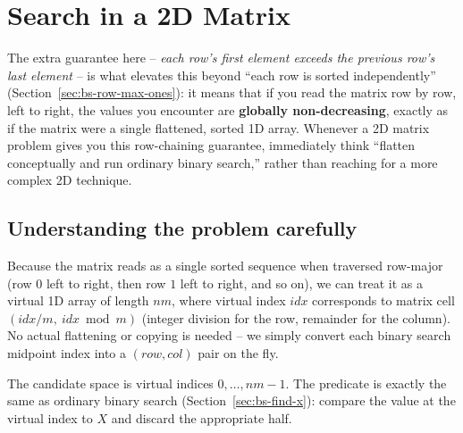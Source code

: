 \section{Search in a 2D Matrix}
\label{sec:bs-search-2d-matrix}


\begin{patternbox}
The extra guarantee here -- \emph{each row's first element exceeds the
previous row's last element} -- is what elevates this beyond ``each row is
sorted independently'' (Section~\ref{sec:bs-row-max-ones}): it means that
if you read the matrix row by row, left to right, the values you encounter
are \textbf{globally non-decreasing}, exactly as if the matrix were a
single flattened, sorted 1D array. Whenever a 2D matrix problem gives you
this row-chaining guarantee, immediately think ``flatten conceptually and
run ordinary binary search,'' rather than reaching for a more complex 2D
technique.
\end{patternbox}

\subsection*{Understanding the problem carefully}

Because the matrix reads as a single sorted sequence when traversed
row-major (row $0$ left to right, then row $1$ left to right, and so on),
we can treat it as a virtual 1D array of length $nm$, where virtual index
$\textit{idx}$ corresponds to matrix cell
$(\textit{idx} / m,\ \textit{idx} \bmod m)$ (integer division for the row,
remainder for the column). No actual flattening or copying is needed --
we simply convert each binary search midpoint index into a
$(\textit{row}, \textit{col})$ pair on the fly.

\begin{ideabox}
The candidate space is virtual indices $0, \dots, nm-1$. The predicate is
exactly the same as ordinary binary search
(Section~\ref{sec:bs-find-x}): compare the value at the virtual index to
$X$ and discard the appropriate half.
\end{ideabox}

